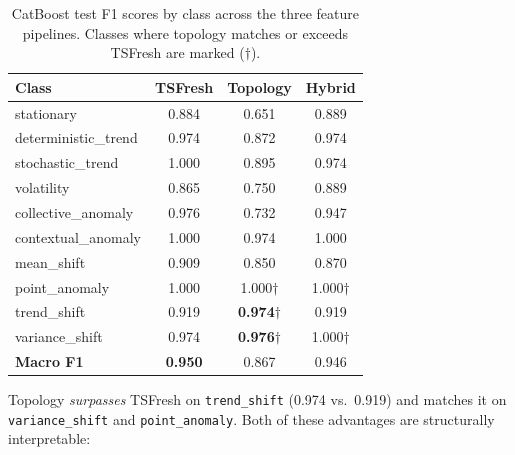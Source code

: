 \documentclass[12pt, a4paper]{article}
\theoremstyle{definition}
\theoremstyle{plain}
\begin{document}
\begin{table}[H]
\centering
\caption{CatBoost test F1 scores by class across the three feature pipelines.
  Classes where topology matches or exceeds TSFresh are marked ($\dagger$).}
\label{tab:per_class}
\begin{tabular}{lccc}
\toprule
\textbf{Class} & \textbf{TSFresh} & \textbf{Topology} & \textbf{Hybrid} \\
\midrule
stationary          & 0.884 & 0.651 & 0.889 \\
deterministic\_trend & 0.974 & 0.872 & 0.974 \\
stochastic\_trend    & 1.000 & 0.895 & 0.974 \\
volatility          & 0.865 & 0.750 & 0.889 \\
collective\_anomaly  & 0.976 & 0.732 & 0.947 \\
contextual\_anomaly  & 1.000 & 0.974 & 1.000 \\
mean\_shift          & 0.909 & 0.850 & 0.870 \\
point\_anomaly       & 1.000 & 1.000$\dagger$ & 1.000$\dagger$ \\
trend\_shift         & 0.919 & \textbf{0.974}$\dagger$ & 0.919 \\
variance\_shift      & 0.974 & \textbf{0.976}$\dagger$ & 1.000$\dagger$ \\
\midrule
\textbf{Macro F1}   & \textbf{0.950} & 0.867 & 0.946 \\
\bottomrule
\end{tabular}
\end{table}

\noindent
Topology \emph{surpasses} TSFresh on \texttt{trend\_shift} (0.974 vs.\ 0.919)
and matches it on \texttt{variance\_shift} and \texttt{point\_anomaly}. Both of
these advantages are structurally interpretable:
\end{document}
